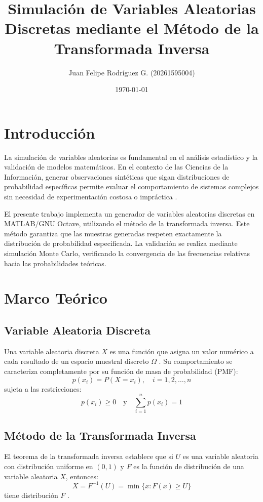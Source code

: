\documentclass{article}
\title{Simulación de Variables Aleatorias Discretas mediante el Método de la Transformada Inversa}
\author{Juan Felipe Rodríguez G. (20261595004)}
\date{\today}
\begin{document}
    \maketitle
    
    \section*{Introducción}
    
    La simulación de variables aleatorias es fundamental en el análisis estadístico y la validación de modelos matemáticos. En el contexto de las Ciencias de la Información, generar observaciones sintéticas que sigan distribuciones de probabilidad específicas permite evaluar el comportamiento de sistemas complejos sin necesidad de experimentación costosa o impráctica \cite{walpole2017}.
    
    El presente trabajo implementa un generador de variables aleatorias discretas en MATLAB/GNU Octave, utilizando el método de la transformada inversa. Este método garantiza que las muestras generadas respeten exactamente la distribución de probabilidad especificada. La validación se realiza mediante simulación Monte Carlo, verificando la convergencia de las frecuencias relativas hacia las probabilidades teóricas.
    
    \section*{Marco Teórico}
    
    \subsection*{Variable Aleatoria Discreta}
    
    Una variable aleatoria discreta $X$ es una función que asigna un valor numérico a cada resultado de un espacio muestral discreto $\Omega$ \cite{walpole2017}. Su comportamiento se caracteriza completamente por su función de masa de probabilidad (PMF):
    $$ p(x_i) = P(X = x_i), \quad i = 1, 2, \ldots, n $$
    sujeta a las restricciones:
    $$ p(x_i) \geq 0 \quad \text{y} \quad \sum_{i=1}^{n} p(x_i) = 1 $$
    
    \subsection*{Método de la Transformada Inversa}
    
    El teorema de la transformada inversa establece que si $U$ es una variable aleatoria con distribución uniforme en $(0,1)$ y $F$ es la función de distribución de una variable aleatoria $X$, entonces:
    $$ X = F^{-1}(U) = \min\{x : F(x) \geq U\} $$
    tiene distribución $F$ \cite{walpole2017}.
    
\end{document}
